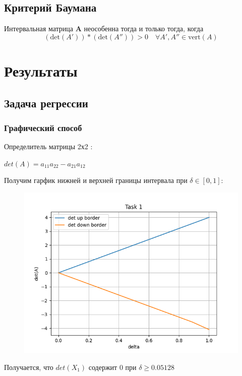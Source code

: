 \documentclass[a4paper,12pt]{article}
\begin{document}
\subsection{Критерий Баумана}
Интервальная матрица $\textbf{A}$ неособенна тогда и только тогда, когда 
\begin{equation}
    (\mathrm{det}(A'))*(\mathrm{det}(A''))>0 \quad \forall A',A''\in \mathrm{vert}(A)
\end{equation}

\section{Результаты}
\subsection{Задача регрессии}
\subsubsection{Графический способ}
Определитель матрицы 2х2 :
\begin{center}
    $det(A) = a_{11}a_{22} - a_{21}a_{12}$
\end{center}
Получим гарфик нижней и верхней границы интервала при $\delta \in [0,1]$:
\begin{figure}[H]
        \centering
        \includegraphics[width=0.5\linewidth]{task1.png}
\end{figure}
Получается, что $det(X_1)$ содержит 0 при $\delta \geqslant 0.05128$
\end{document}
